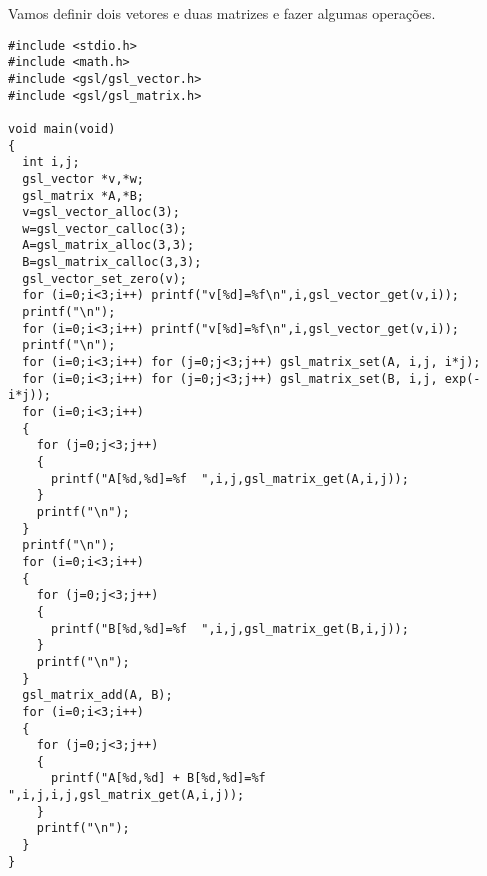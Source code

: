 \begin{ex}Vamos definir dois vetores e duas matrizes e fazer algumas operações.
\end{ex}
\begin{verbatim}
#include <stdio.h>
#include <math.h>
#include <gsl/gsl_vector.h>
#include <gsl/gsl_matrix.h>

void main(void)
{
  int i,j;
  gsl_vector *v,*w;
  gsl_matrix *A,*B;
  v=gsl_vector_alloc(3);
  w=gsl_vector_calloc(3);
  A=gsl_matrix_alloc(3,3);
  B=gsl_matrix_calloc(3,3);
  gsl_vector_set_zero(v);
  for (i=0;i<3;i++) printf("v[%d]=%f\n",i,gsl_vector_get(v,i));
  printf("\n");
  for (i=0;i<3;i++) printf("v[%d]=%f\n",i,gsl_vector_get(v,i));
  printf("\n");
  for (i=0;i<3;i++) for (j=0;j<3;j++) gsl_matrix_set(A, i,j, i*j);
  for (i=0;i<3;i++) for (j=0;j<3;j++) gsl_matrix_set(B, i,j, exp(-i*j));
  for (i=0;i<3;i++)
  {
    for (j=0;j<3;j++)
    {
      printf("A[%d,%d]=%f  ",i,j,gsl_matrix_get(A,i,j));
    }
    printf("\n");
  }
  printf("\n");
  for (i=0;i<3;i++)
  {
    for (j=0;j<3;j++)
    {
      printf("B[%d,%d]=%f  ",i,j,gsl_matrix_get(B,i,j));
    }
    printf("\n");
  }
  gsl_matrix_add(A, B);
  for (i=0;i<3;i++)
  {
    for (j=0;j<3;j++)
    {
      printf("A[%d,%d] + B[%d,%d]=%f  ",i,j,i,j,gsl_matrix_get(A,i,j));
    }
    printf("\n");
  }
}
\end{verbatim}


